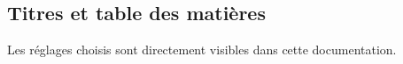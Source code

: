 \documentclass{tutodoc}
\begin{document}
\subsection{Titres et table des matières}

Les réglages choisis sont directement visibles dans cette documentation.
\end{document}
